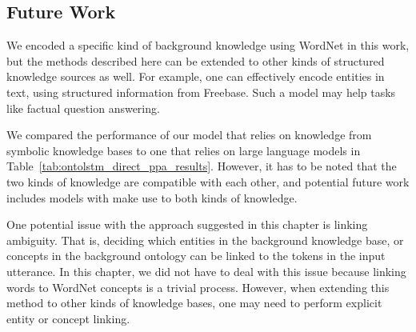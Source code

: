 \subsection{Future Work}
We encoded a specific kind of background knowledge using WordNet in this work, but the methods described here can be extended 
to other kinds of structured knowledge sources as well. For example, one can effectively encode entities in text, using structured information
from Freebase. Such a model may help tasks like factual question answering.

We compared the performance of our model that relies on knowledge from symbolic knowledge bases
to one that relies on large language models in Table~\ref{tab:ontolstm_direct_ppa_results}. However, it has to be noted that the two kinds of knowledge
are compatible with each other, and potential future work includes models with make use to both
kinds of knowledge.

One potential issue with the approach suggested in this chapter is
linking ambiguity. That is, deciding which entities in the background knowledge base, or concepts in the background ontology can be linked to
the tokens in the input utterance. In this chapter, we did not have to deal with this issue because linking words to WordNet concepts is a
trivial process. However, when extending this method to other kinds of knowledge bases, one may need to perform explicit entity or concept linking.
